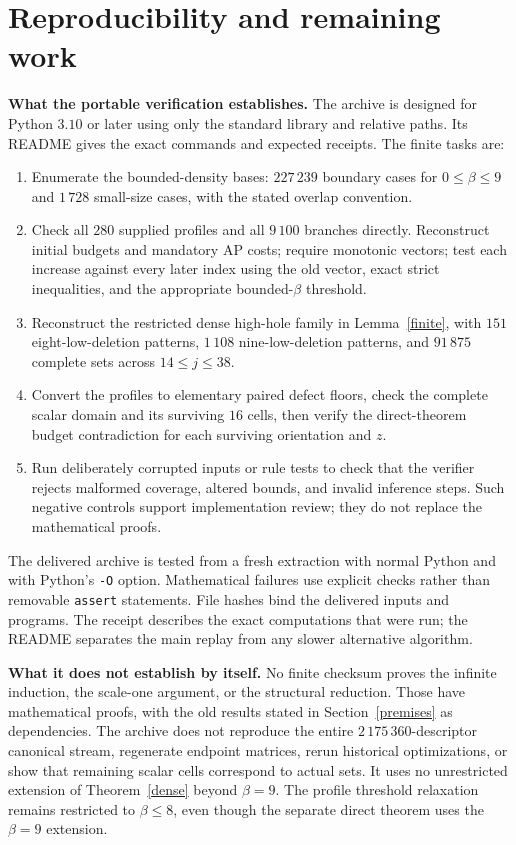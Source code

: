 \documentclass[11pt,a4paper]{article}
\begin{document}
\section{Reproducibility and remaining work}
\textbf{What the portable verification establishes.} The archive is designed for Python $3.10$ or later using only the standard library and relative paths. Its README gives the exact commands and expected receipts. The finite tasks are:
\begin{enumerate}
\item Enumerate the bounded-density bases: $227\,239$ boundary cases for $0\le\beta\le9$ and $1\,728$ small-size cases, with the stated overlap convention.
\item Check all $280$ supplied profiles and all $9\,100$ branches directly. Reconstruct initial budgets and mandatory AP costs; require monotonic vectors; test each increase against every later index using the old vector, exact strict inequalities, and the appropriate bounded-$\beta$ threshold.
\item Reconstruct the restricted dense high-hole family in Lemma~\ref{finite}, with $151$ eight-low-deletion patterns, $1\,108$ nine-low-deletion patterns, and $91\,875$ complete sets across $14\le j\le38$.
\item Convert the profiles to elementary paired defect floors, check the complete scalar domain and its surviving $16$ cells, then verify the direct-theorem budget contradiction for each surviving orientation and $z$.
\item Run deliberately corrupted inputs or rule tests to check that the verifier rejects malformed coverage, altered bounds, and invalid inference steps. Such negative controls support implementation review; they do not replace the mathematical proofs.
\end{enumerate}
The delivered archive is tested from a fresh extraction with normal Python and with Python's \texttt{-O} option. Mathematical failures use explicit checks rather than removable \texttt{assert} statements. File hashes bind the delivered inputs and programs. The receipt describes the exact computations that were run; the README separates the main replay from any slower alternative algorithm.

\textbf{What it does not establish by itself.} No finite checksum proves the infinite induction, the scale-one argument, or the structural reduction. Those have mathematical proofs, with the old results stated in Section~\ref{premises} as dependencies. The archive does not reproduce the entire $2\,175\,360$-descriptor canonical stream, regenerate endpoint matrices, rerun historical optimizations, or show that remaining scalar cells correspond to actual sets. It uses no unrestricted extension of Theorem~\ref{dense} beyond $\beta=9$. The profile threshold relaxation remains restricted to $\beta\le8$, even though the separate direct theorem uses the $\beta=9$ extension.
\end{document}
